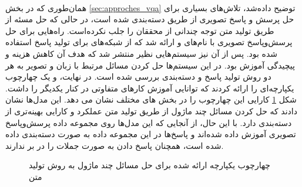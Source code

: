 \paragraph{}
{
    همان‌طوری که در بخش 
    \ref{sec:approches_vqa}
    توضیح داده‌شد، تلاش‌های بسیاری برای حل پرسش و پاسخ تصویری از طریق دسته‌بندی
    شده است، در حالی که حل مسئه از طریق تولید متن توجه چندانی از محققان را 
    جلب نکرده‌است. راه‌هایی برای حل پرسش‌وپاسخ تصویری با نام‌های
     \cite{gao2015you} 
    و
     \cite{wu2016ask} 
    ارائه شد که از شبکه‌های 
    برای تولید پاسخ استفاده شده بود. 
    پس از آن نیز سیستم‌هایی نظیر 
     \cite{wang2021simvlm}
    منتشر شد که هدف آن کاهش هزینه و پیچیدگی آموزش بود. در این 
    سیستم‌ها حل کردن مسائل مرتبط با زبان و تصویر به هر دو روش
    تولید پاسخ و دسته‌بندی بررسی شده است. 
    در نهایت، 
     و  \cite{pmlr-v139-cho21a}
    یک چهارچوب یکپارچه‌ای را ارائه کردند که توانایی آموزش 
    کار‌های متفاوتی در کنار یکدیگر را داشت. شکل
    \ref{fig:vl-bart}
    کارایی این چهارچوب را در بخش های مختلف نشان می دهد.
    این مدل‌ها نشان‌ دادند که
    حل کردن مسائل چند ماژول از طریق تولید متن عملکرد و کارایی بهینه‌تری 
    از دسته‌بندی دارد. با این حال، از آنجایی که 
    این مدل‌ها روی مجموعه داده پرسش‌وپاسخ تصویری 
    \cite{VQA}
    آموزش داده شده‌اند و پاسخ‌ها در این مجموعه داده به صورت دسته‌بندی داده
    شده است، همچنان پاسخ دادن به صورت جملات را در بر ندارند.
    \begin{figure}[H]
        \caption{چهارچوب یکپارچه ارائه شده برای حل مسائل چند ماژول به روش تولید متن}
        \label{fig:vl-bart}
    \end{figure}

}

